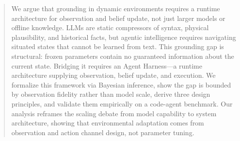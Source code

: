 \begin{abstract}
We argue that grounding in dynamic environments requires a runtime architecture for observation and belief update, not just larger models or offline knowledge. LLMs are static compressors of syntax, physical plausibility, and historical facts, but agentic intelligence requires navigating situated states that cannot be learned from text. This grounding gap is structural: frozen parameters contain no guaranteed information about the current state. Bridging it requires an Agent Harness---a runtime architecture supplying observation, belief update, and execution. We formalize this framework via Bayesian inference, show the gap is bounded by observation fidelity rather than model scale, derive three design principles, and validate them empirically on a code-agent benchmark. Our analysis reframes the scaling debate from model capability to system architecture, showing that environmental adaptation comes from observation and action channel design, not parameter tuning.
\end{abstract}
